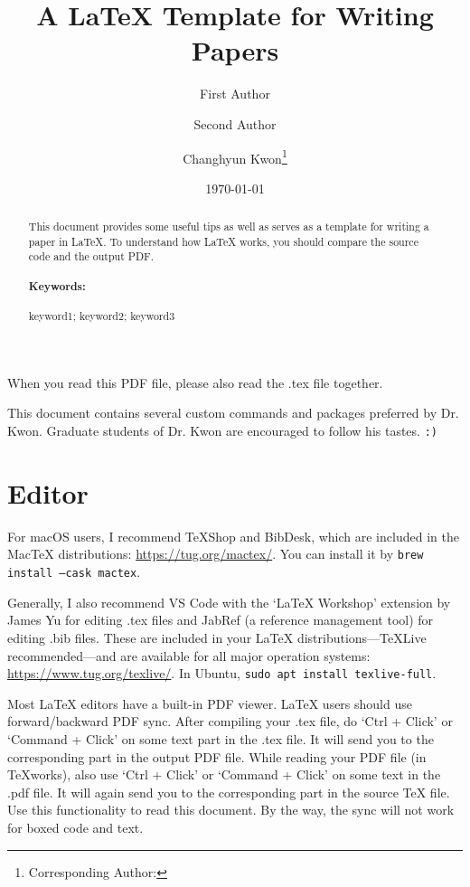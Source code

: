 \documentclass[letterpaper, 11pt]{article}
\title{A LaTeX Template for Writing Papers}
\author[1]{First Author}
\author[2]{Second Author}
\author[3]{Changhyun Kwon\footnote{Corresponding Author: \email{chkwon@kaist.ac.kr}}}
\affil[1]{Department of First Engineering, First University}
\affil[2]{Department of Second Engineering, First University}
\affil[3]{Department of Industrial and Systems Engineering, KAIST, Daejeon, 34141, Republic of Korea}
\date{\today}
\newcommand{\bluenote}[1]{{\Large\color{blue}#1}}
\newcommand{\rednote}[1]{{\Large\color{red}#1}}
\begin{document}
\maketitle

\begin{abstract}
This document provides some useful tips as well as serves as a template for writing a paper in LaTeX.
To understand how LaTeX works, you should compare the source code and the output PDF.

\paragraph{Keywords:} keyword1; keyword2; keyword3
\end{abstract}



\rednote{When you read this PDF file, please also read the .tex file together.}

\bluenote{This document contains several custom commands and packages preferred by Dr. Kwon.
Graduate students of Dr. Kwon are encouraged to follow his tastes. \texttt{:)}}


\section{Editor} \label{sec:editor}

For macOS users, I recommend TeXShop and BibDesk, which are included in the MacTeX distributions: \url{https://tug.org/mactex/}. You can install it by \texttt{brew install --cask mactex}.

Generally, I also recommend VS Code with the `LaTeX Workshop' extension by James Yu for editing .tex files and JabRef (a reference management tool) for editing .bib files. These are included in your LaTeX distributions---TeXLive recommended---and are available for all major operation systems: \url{https://www.tug.org/texlive/}.
In Ubuntu, \texttt{sudo apt install texlive-full}.

Most LaTeX editors have a built-in PDF viewer.
LaTeX users should use forward/backward PDF sync.
After compiling your .tex file, do `Ctrl + Click' or `Command + Click' on some text part in the .tex file.
It will send you to the corresponding part in the output PDF file.
While reading your PDF file (in TeXworks), also use `Ctrl + Click' or `Command + Click' on some text in the .pdf file.
It will again send you to the corresponding part in the source TeX file.
Use this functionality to read this document.
By the way, the sync will not work for boxed code and text.
\end{document}
